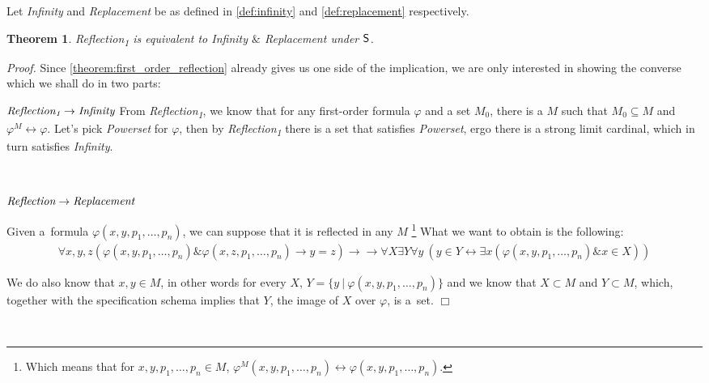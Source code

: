 \documentclass[12pt,a4paper]{article}
\newtheorem{theorem}{Theorem}[section]
\newenvironment{proof}
{\noindent \textit{Proof.}}
{\hspace*{\fill} $\Box$}
\renewcommand{\iff}{\leftrightarrow}
\newcommand{\then}{\rightarrow}
\newcommand{\et}{\mathrel{\&}}
\begin{document}
Let \emph{Infinity} and \emph{Replacement} be as defined in \ref{def:infinity} and \ref{def:replacement} respectively.

\begin{theorem}\label{theorem:levy_equivalence_contemporary}
\emph{Reflection}\textsubscript{1} is equivalent to \emph{Infinity} $ \et $ \emph{Replacement} under $\sf{S}$.
\end{theorem}
\begin{proof}
Since \ref{theorem:first_order_reflection} already gives us one side of the implication, we are only interested in showing the converse which we shall do in two parts:

$\bold{\emph{Reflection\textsubscript{1}} \then \emph{Infinity}}$
From \emph{Reflection\textsubscript{1}}, we know that for any first-order formula $\varphi$ and a set $M_0$, there is a $M$ such that $M_0 \subseteq M$ and $\varphi^M \iff \varphi$. Let's pick \emph{Powerset} for $\varphi$, then by \emph{Reflection\textsubscript{1}} there is a set that satisfies \emph{Powerset}, ergo there is a strong limit cardinal, which in turn satisfies \emph{Infinity}.

\

$\bold{\emph{Reflection} \then \emph{Replacement}}$

Given a~formula $\varphi(x, y, p_1, \ldots, p_n)$, we can suppose that it is reflected in any $M$ \footnote{Which means that for $x, y, p_1, \ldots, p_n \in M$, $\varphi^M(x, y, p_1, \ldots, p_n) \iff \varphi(x, y, p_1, \ldots, p_n)$.}
What we want to obtain is the following:
\begin{equation}
\begin{gathered}
\forall x, y, z (\varphi(x, y, p_1, \ldots, p_n) \et \varphi(x, z, p_1, \ldots, p_n) \then y = z) \then
\then \forall X \exists Y \forall y\ (y \in Y \iff \exists x (\varphi(x, y, p_1, \ldots, p_n) \et x \in X ))
\end{gathered}
\end{equation}

We do also know that $x, y \in M$, in other words for every $X$, $Y = \{y\ |\ \varphi(x, y, p_1, \ldots, p_n)\}$ and we know that $X \subset M$ and $Y \subset M$, which, together with the specification schema implies that $Y$, the image of $X$ over $\varphi$, is a~set.
\end{proof}

\
\end{document}
